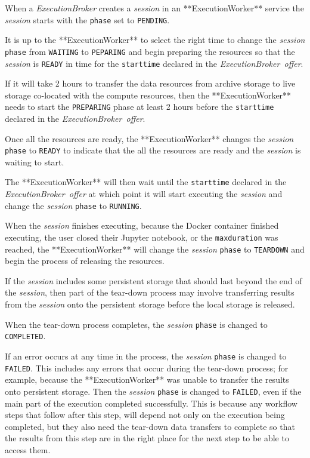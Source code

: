 \documentclass[11pt,a4paper]{ivoa}
\newcommand{\execworkerclass} {**ExecutionWorker**}
\newcommand{\execbrokerclass} {\textit{ExecutionBroker}}
\newcommand{\execoffer}[1] {\textit{ExecutionBroker~offer#1}}
\newcommand{\workerjob}[1] {\textit{session#1}}
\newcommand{\teardown} {tear-down}
\newcommand{\jupyternotebook} {Jupyter notebook}
\newcommand{\dockercontainer} {Docker container}
\newcommand{\codeword}[1] {\texttt{#1}}
\begin{document}
When a \execbrokerclass{} creates a \workerjob{} in an \execworkerclass{} service the
\workerjob{} starts with the \codeword{phase} set to \codeword{PENDING}.

It is up to the \execworkerclass{} to select the right time to change the \workerjob{}
\codeword{phase} from \codeword{WAITING} to \codeword{PEPARING} and begin preparing the resources so that
the \workerjob{} is \codeword{READY} in time for the \codeword{starttime} declared
in the \execoffer{}.

If it will take 2 hours to transfer the data resources
from archive storage to live storage co-located with the compute resources,
then the \execworkerclass{} needs to start the \codeword{PREPARING} phase at least 2 hours
before the \codeword{starttime} declared in the \execoffer{}.

Once all the resources are ready, the \execworkerclass{} changes the \workerjob{}
\codeword{phase} to \codeword{READY} to indicate that the all the resources
are ready and the \workerjob{} is waiting to start.

The \execworkerclass{} will then wait until the \codeword{starttime} declared in the \execoffer{}
at which point it will start executing the \workerjob{} and change the \workerjob{} \codeword{phase}
to \codeword{RUNNING}.

When the \workerjob{} finishes executing, because the \dockercontainer{} finished executing,
the user closed their \jupyternotebook, or the \codeword{maxduration} was reached,
the \execworkerclass{} will change the \workerjob{} \codeword{phase} to \codeword{TEARDOWN} and
begin the process of releasing the resources.

If the \workerjob{} includes some persistent storage that should last beyond the end of the \workerjob{},
then part of the \teardown{} process may involve transferring results from the \workerjob{}
onto the persistent storage before the local storage is released.

When the \teardown{} process completes, the \workerjob{} \codeword{phase} is changed to \codeword{COMPLETED}.

If an error occurs at any time in the process, the \workerjob{} \codeword{phase} is changed to \codeword{FAILED}.
This includes any errors that occur during the \teardown{} process; for example, because
the \execworkerclass{} was unable to transfer the results onto persistent storage.
Then the \workerjob{} \codeword{phase} is changed to \codeword{FAILED}, even if the main part of the
execution completed successfully.
This is because any workflow steps that follow after this step, will depend not only on the execution being
completed, but they also need the \teardown{} data transfers to complete so that the results from this step
are in the right place for the next step to be able to access them.
\end{document}
